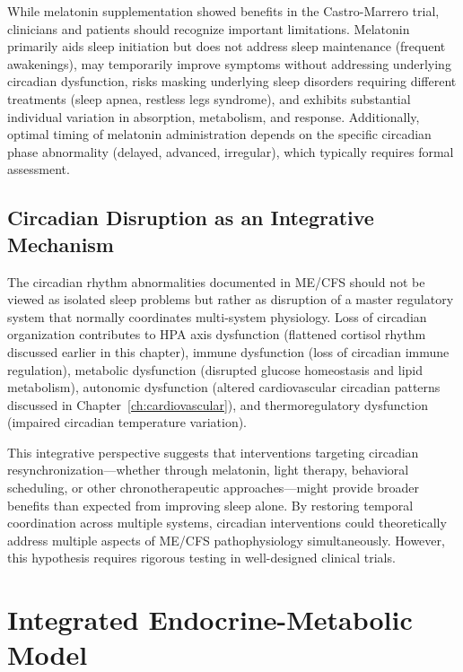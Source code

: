 \begin{warning}
\label{warn:melatonin-limits}
While melatonin supplementation showed benefits in the Castro-Marrero trial, clinicians and patients should recognize important limitations. Melatonin primarily aids sleep initiation but does not address sleep maintenance (frequent awakenings), may temporarily improve symptoms without addressing underlying circadian dysfunction, risks masking underlying sleep disorders requiring different treatments (sleep apnea, restless legs syndrome), and exhibits substantial individual variation in absorption, metabolism, and response. Additionally, optimal timing of melatonin administration depends on the specific circadian phase abnormality (delayed, advanced, irregular), which typically requires formal assessment.
\end{warning}

\subsection{Circadian Disruption as an Integrative Mechanism}

The circadian rhythm abnormalities documented in ME/CFS should not be viewed as isolated sleep problems but rather as disruption of a master regulatory system that normally coordinates multi-system physiology. Loss of circadian organization contributes to HPA axis dysfunction (flattened cortisol rhythm discussed earlier in this chapter), immune dysfunction (loss of circadian immune regulation), metabolic dysfunction (disrupted glucose homeostasis and lipid metabolism), autonomic dysfunction (altered cardiovascular circadian patterns discussed in Chapter~\ref{ch:cardiovascular}), and thermoregulatory dysfunction (impaired circadian temperature variation).

This integrative perspective suggests that interventions targeting circadian resynchronization---whether through melatonin, light therapy, behavioral scheduling, or other chronotherapeutic approaches---might provide broader benefits than expected from improving sleep alone. By restoring temporal coordination across multiple systems, circadian interventions could theoretically address multiple aspects of ME/CFS pathophysiology simultaneously. However, this hypothesis requires rigorous testing in well-designed clinical trials.

\section{Integrated Endocrine-Metabolic Model}
\label{sec:endocrine-integration}

